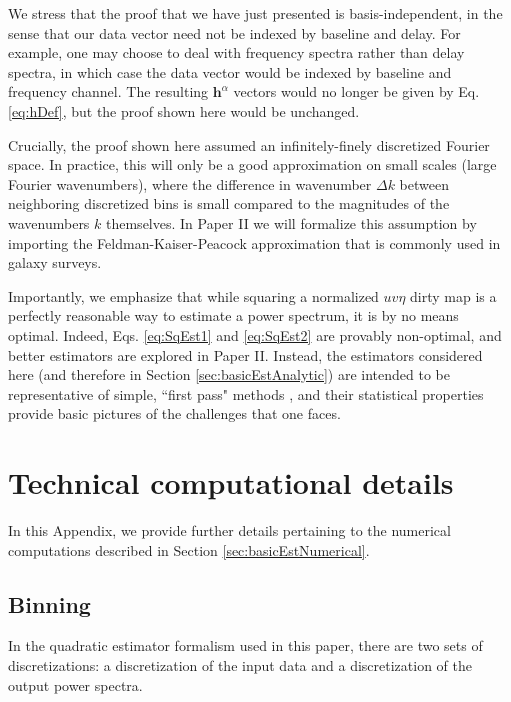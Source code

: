 \documentclass[twocolumn,aps,prd,nofootinbib,showpacs]{revtex4-1}
\begin{document}
We stress that the proof that we have just presented is basis-independent, in the sense that our data vector need not be indexed by baseline and delay.  For example, one may choose to deal with frequency spectra rather than delay spectra, in which case the data vector would be indexed by baseline and frequency channel.  The resulting $\mathbf{h}^\alpha$ vectors would no longer be given by  Eq. \eqref{eq:hDef}, but the proof shown here would be unchanged.

Crucially, the proof shown here assumed an infinitely-finely discretized Fourier space.  In practice, this will only be a good approximation on small scales (large Fourier wavenumbers), where the difference in wavenumber $\Delta k$ between neighboring discretized bins is small compared to the magnitudes of the wavenumbers $k$ themselves.  In Paper II we will formalize this assumption by importing the Feldman-Kaiser-Peacock approximation that is commonly used in galaxy surveys.

Importantly, we emphasize that while squaring a normalized $uv\eta$ dirty map is a perfectly reasonable way to estimate a power spectrum, it is by no means optimal.  Indeed,  Eqs. \eqref{eq:SqEst1} and \eqref{eq:SqEst2} are provably non-optimal, and better estimators are explored in Paper II.  Instead, the estimators considered here (and therefore in Section \ref{sec:basicEstAnalytic}) are intended to be representative of simple, ``first pass" methods \cite{Bernardi2013,Thyagarajan2013,Hazelton2013}, and their statistical properties provide basic pictures of the challenges that one faces.

\section{Technical computational details}
\label{appendix:Computational}

In this Appendix, we provide further details pertaining to the numerical computations described in Section \ref{sec:basicEstNumerical}.

\subsection{Binning}
In the quadratic estimator formalism used in this paper, there are two sets of discretizations: a discretization of the input data and a discretization of the output power spectra.
\end{document}
